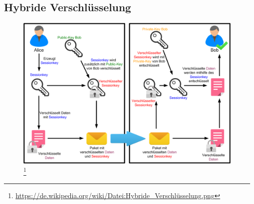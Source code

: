 \documentclass[10pt]{beamer}
\begin{document}
\subsection{Hybride Verschlüsselung}
\begin{frame}[plain]
	\begin{figure}[p]
		\centering
		\includegraphics[scale=0.25]{hybrid.png}
		\let\thefootnote\relax\footnote{\url{https://de.wikipedia.org/wiki/Datei:Hybride_Verschlüsselung.png}}
	\end{figure}
\end{frame}
\end{document}
